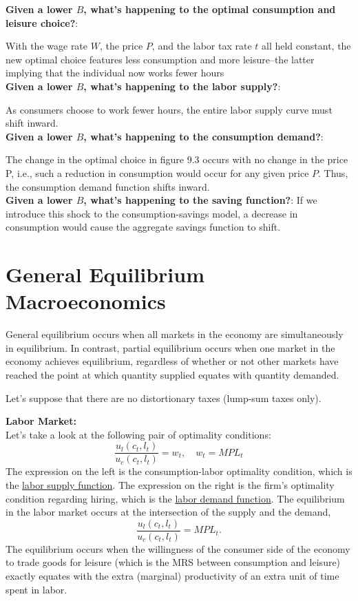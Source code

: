 \documentclass[10pt]{article}
\begin{document}
{\textbf {Given a lower $ B $, what's happening to the optimal consumption and leisure choice?}}:

With the wage rate $ W $, the price $ P $, and the labor tax rate $ t $ all held constant,
the new optimal choice features less consumption and more leisure--the latter implying that the
individual now works fewer hours
\\


{\textbf {Given a lower $ B $, what's happening to the labor supply?}}:

As consumers choose to work fewer hours, the entire labor supply curve must shift inward.
\\

{\textbf {Given a lower $ B $, what's happening to the consumption demand?}}:

The change in the optimal choice in figure 9.3 occurs with no change in the price P, i.e., such a 
reduction in consumption would occur for any given price $ P $. Thus, the consumption demand
function shifts inward.
\\

{\textbf {Given a lower $ B $, what's happening to the saving function?}}:
If we introduce this shock to the consumption-savings model, a decrease in consumption would cause the
aggregate savings function to shift.
\\



\section{General Equilibrium Macroeconomics}
General equilibrium occurs when all markets in the economy are simultaneously in equilibrium.
In contrast, partial equilibrium  occurs when one market in the economy achieves equilibrium, 
regardless of whether or not other markets have reached the point at which quantity supplied 
equates with quantity demanded.

Let's suppose that there are no distortionary taxes (lump-sum taxes only). 

{\textbf {Labor Market:}}\\
Let's take a look at the following pair of optimality conditions:
\begin{equation*}
\frac{u_{l}(c_{t}, l_{t})}{u_{c}(c_{t}, l_{t})} = w_{t}, \quad w_{t} = MPL_{t}
\end{equation*}
The expression on the left is the consumption-labor optimality condition, which is the 
{\underline {labor supply function}}.
The expression on the right is the firm's optimality condition regarding hiring, which is the
{\underline {labor demand function}}.
The equilibrium in the labor market occurs at the intersection of the supply and the demand,
\begin{equation*}
\frac{u_{l}(c_{t}, l_{t})}{u_{c}(c_{t}, l_{t})} = MPL_{t}.
\end{equation*}
The equilibrium occurs when the willingness of the consumer side of the economy to trade goods for 
leisure (which is the MRS between consumption and leisure) exactly equates with the extra (marginal)
productivity of an extra unit of time spent in labor.
\end{document}
